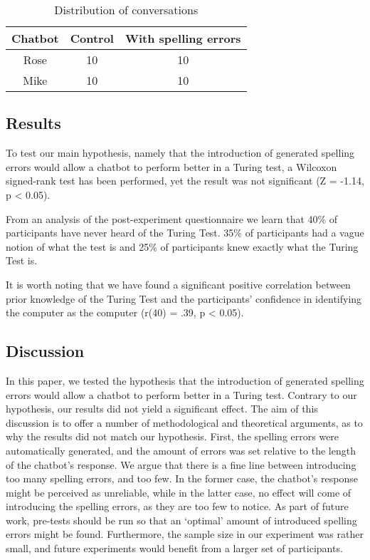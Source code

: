 \begin{table}[!ht]
   \begin{center}
      \caption{Distribution of conversations}
      \label{tabdistributionofconversations}
      \vskip 0.12in
      \begin{tabular}[center]{| c | c | c |}
         \hline
         Chatbot & Control & With spelling errors \\
         \hline \hline
         Rose & 10 & 10\\
         Mike & 10 & 10\\
         \hline
      \end{tabular}
   \end{center}
\end{table}

\subsection{Results}
To test our main hypothesis, namely that the introduction of generated spelling errors would allow a chatbot to perform better in a Turing test, a Wilcoxon signed-rank test has been performed, yet the result was not significant (Z = -1.14, p < 0.05).

From an analysis of the post-experiment questionnaire we learn that 40\% of participants have never heard of the Turing Test. 35\% of participants had a vague notion of what the test is and 25\% of participants knew exactly what the Turing Test is.

It is worth noting that we have found a significant positive correlation between prior knowledge of the Turing Test and the participants’ confidence in identifying the computer as the computer (r(40) = .39, p < 0.05).

\subsection{Discussion}
In this paper, we tested the hypothesis that the introduction of generated spelling errors would allow a chatbot to perform better in a Turing test. Contrary to our hypothesis, our results did not yield a significant effect. The aim of this discussion is to offer a number of methodological and theoretical arguments, as to why the results did not match our hypothesis. First, the spelling errors were automatically generated, and the amount of errors was set relative to the length of the chatbot’s response. We argue that there is a fine line between introducing too many spelling errors, and too few. In the former case, the chatbot’s response might be perceived as unreliable, while in the latter case, no effect will come of introducing the spelling errors, as they are too few to notice. As part of future work, pre-tests should be run so that an ‘optimal’ amount of introduced spelling errors might be found. Furthermore, the sample size in our experiment was rather small, and future experiments would benefit from a larger set of participants.

